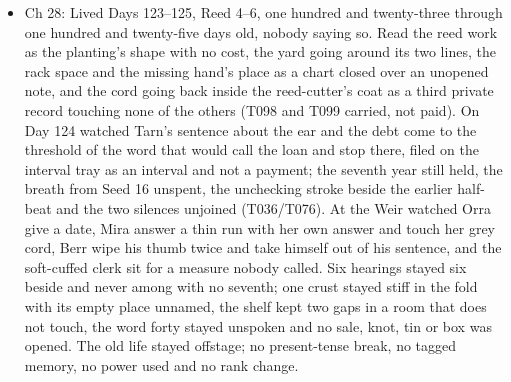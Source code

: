 \documentclass{design/chronicle}
\begin{document}
{\begin{itemize}[leftmargin=1.4em,itemsep=1pt,topsep=3pt,parsep=0pt]
\end{itemize}

\begin{itemize}[leftmargin=1.4em,itemsep=1pt,topsep=3pt,parsep=0pt]

\item Ch 28: Lived Days 123–125, Reed 4–6, one hundred and twenty-three through one hundred and twenty-five days old, nobody saying so. Read the reed work as the planting’s shape with no cost, the yard going around its two lines, the rack space and the missing hand’s place as a chart closed over an unopened note, and the cord going back inside the reed-cutter’s coat as a third private record touching none of the others (T098 and T099 carried, not paid). On Day 124 watched Tarn’s sentence about the ear and the debt come to the threshold of the word that would call the loan and stop there, filed on the interval tray as an interval and not a payment; the seventh year still held, the breath from Seed 16 unspent, the unchecking stroke beside the earlier half-beat and the two silences unjoined (T036/T076). At the Weir watched Orra give a date, Mira answer a thin run with her own answer and touch her grey cord, Berr wipe his thumb twice and take himself out of his sentence, and the soft-cuffed clerk sit for a measure nobody called. Six hearings stayed six beside and never among with no seventh; one crust stayed stiff in the fold with its empty place unnamed, the shelf kept two gaps in a room that does not touch, the word forty stayed unspoken and no sale, knot, tin or box was opened. The old life stayed offstage; no present-tense break, no tagged memory, no power used and no rank change.

\end{itemize}

\begin{itemize}[leftmargin=1.4em,itemsep=1pt,topsep=3pt,parsep=0pt]


\end{itemize}}
\end{document}
